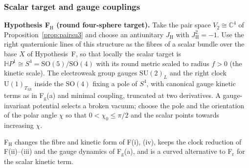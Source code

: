 \documentclass[aps,pra,onecolumn,superscriptaddress,nofootinbib,10pt]{revtex4-2}
\theoremstyle{definition}
\theoremstyle{remark}
\newcommand{\C}{\mathbb{C}}
\newcommand{\HH}{\mathbb{H}}
\newcommand{\SU}{\mathrm{SU}}
\newcommand{\SO}{\mathrm{SO}}
\newcommand{\U}{\mathrm{U}}
\begin{document}
\subsubsection{Scalar target and gauge couplings}

\smallskip\noindent\textbf{Hypothesis F$_{\mathrm H}$ (round four-sphere target).}\label{hyp:FH}  Take the pair space $V_2\cong\C^4$ of
Proposition~\ref{prop:pairsu3} and choose an antiunitary $J_{\mathrm H}$ with $J_{\mathrm H}^2=-1$.  Use the right quaternionic lines of this
structure as the fibres of a scalar bundle over the base $X$ of Hypothesis~F, so that locally the scalar target
is $\HH P^1\cong S^4=\SO(5)/\SO(4)$ with its round metric scaled to radius $f>0$ (the kinetic scale).  The electroweak group
gauges $\SU(2)_L$ and the right clock $\U(1)_{T_{3R}}$ inside the $\SO(4)$ fixing a pole of $S^4$, with canonical gauge kinetic
terms as in F$_{\mathrm g}$(a) and minimal coupling, truncated at two derivatives.  A gauge-invariant potential
selects a broken vacuum; choose the pole and the orientation of the polar angle $\chi$ so that $0<\chi_0\le\pi/2$ and the
scalar points towards increasing $\chi$.

\noindent F$_{\mathrm H}$ changes the fibre and kinetic form of F(i), (iv), keeps the clock reduction of F(ii)--(iii) and the
gauge dynamics of F$_{\mathrm g}$(a), and is a curved alternative to F$_{\mathrm r}$ for the scalar kinetic term.
\end{document}
